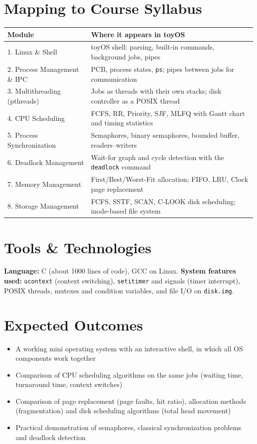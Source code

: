 \documentclass[11pt,a4paper]{article}
\begin{document}
\section*{Mapping to Course Syllabus}
\begin{center}
\small
\begin{tabular}{@{}>{\raggedright}p{5.2cm} p{11.0cm}@{}}
\toprule
\textbf{Module} & \textbf{Where it appears in toyOS} \\
\midrule
1. Linux \& Shell & toyOS shell: parsing, built-in commands, background jobs, pipes \\
2. Process Management \& IPC & PCB, process states, \texttt{ps}; pipes between jobs for communication \\
3. Multithreading (pthreads) & Jobs as threads with their own stacks; disk controller as a POSIX thread \\
4. CPU Scheduling & FCFS, RR, Priority, SJF, MLFQ with Gantt chart and timing statistics \\
5. Process Synchronization & Semaphores, binary semaphores, bounded buffer, readers--writers \\
6. Deadlock Management & Wait-for graph and cycle detection with the \texttt{deadlock} command \\
7. Memory Management & First/Best/Worst-Fit allocation; FIFO, LRU, Clock page replacement \\
8. Storage Management & FCFS, SSTF, SCAN, C-LOOK disk scheduling; inode-based file system \\
\bottomrule
\end{tabular}
\end{center}

\section*{Tools \& Technologies}
\textbf{Language:} C (about 1000 lines of code), GCC on Linux. \textbf{System features used:} \texttt{ucontext} (context switching), \texttt{setitimer} and signals (timer interrupt), POSIX threads, mutexes and condition variables, and file I/O on \texttt{disk.img}.

\section*{Expected Outcomes}
\begin{itemize}[leftmargin=*, itemsep=1pt]
    \item A working mini operating system with an interactive shell, in which all OS components work together
    \item Comparison of CPU scheduling algorithms on the same jobs (waiting time, turnaround time, context switches)
    \item Comparison of page replacement (page faults, hit ratio), allocation methods (fragmentation) and disk scheduling algorithms (total head movement)
    \item Practical demonstration of semaphores, classical synchronization problems and deadlock detection
\end{itemize}
\end{document}
